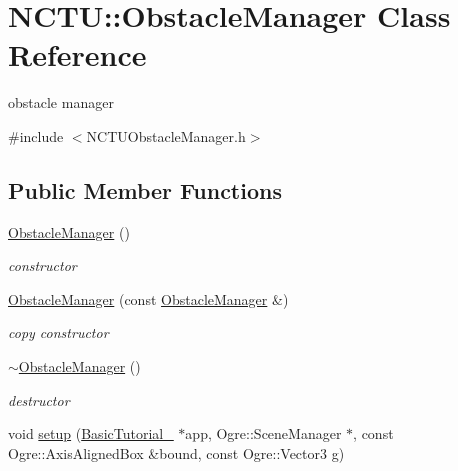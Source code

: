 \hypertarget{class_n_c_t_u_1_1_obstacle_manager}{}\section{N\+C\+TU\+:\+:Obstacle\+Manager Class Reference}
\label{class_n_c_t_u_1_1_obstacle_manager}


obstacle manager  




{\ttfamily \#include $<$N\+C\+T\+U\+Obstacle\+Manager.\+h$>$}

\subsection*{Public Member Functions}
\begin{DoxyCompactItemize}
\item 
\hyperlink{class_n_c_t_u_1_1_obstacle_manager_ada5fb64df1bac37e1f4e9b82769da20d}{Obstacle\+Manager} ()\hypertarget{class_n_c_t_u_1_1_obstacle_manager_ada5fb64df1bac37e1f4e9b82769da20d}{}\label{class_n_c_t_u_1_1_obstacle_manager_ada5fb64df1bac37e1f4e9b82769da20d}

\begin{DoxyCompactList}\small\item\em constructor \end{DoxyCompactList}\item 
\hyperlink{class_n_c_t_u_1_1_obstacle_manager_acaa43e4c78c43cd2c577b3871d292676}{Obstacle\+Manager} (const \hyperlink{class_n_c_t_u_1_1_obstacle_manager}{Obstacle\+Manager} \&)\hypertarget{class_n_c_t_u_1_1_obstacle_manager_acaa43e4c78c43cd2c577b3871d292676}{}\label{class_n_c_t_u_1_1_obstacle_manager_acaa43e4c78c43cd2c577b3871d292676}

\begin{DoxyCompactList}\small\item\em copy constructor \end{DoxyCompactList}\item 
\hyperlink{class_n_c_t_u_1_1_obstacle_manager_a48031a527139901ddfc4d1a9d51ff367}{$\sim$\+Obstacle\+Manager} ()\hypertarget{class_n_c_t_u_1_1_obstacle_manager_a48031a527139901ddfc4d1a9d51ff367}{}\label{class_n_c_t_u_1_1_obstacle_manager_a48031a527139901ddfc4d1a9d51ff367}

\begin{DoxyCompactList}\small\item\em destructor \end{DoxyCompactList}\item 
void \hyperlink{class_n_c_t_u_1_1_obstacle_manager_a798eefd08709801f44285d155e0a5902}{setup} (\hyperlink{class_basic_tutorial__00}{Basic\+Tutorial\+\_} $\ast$app, Ogre\+::\+Scene\+Manager $\ast$, const Ogre\+::\+Axis\+Aligned\+Box \&bound, const Ogre\+::\+Vector3 g)\hypertarget{class_n_c_t_u_1_1_obstacle_manager_a798eefd08709801f44285d155e0a5902}{}\label{class_n_c_t_u_1_1_obstacle_manager_a798eefd08709801f44285d155e0a5902}


\end{DoxyCompactItemize}
